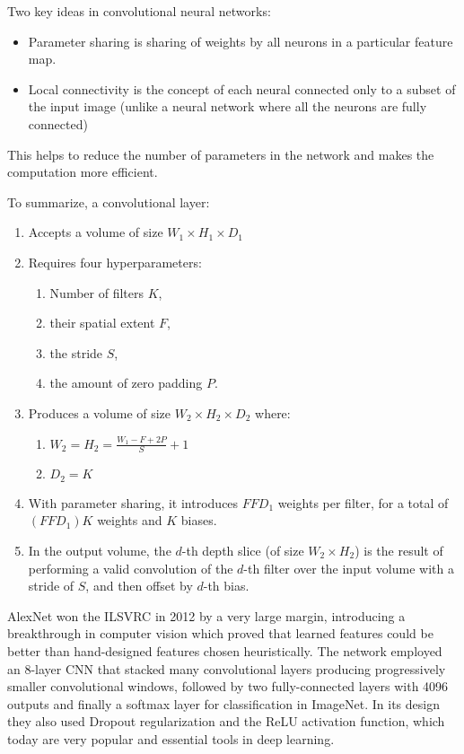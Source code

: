 Two key ideas in convolutional neural networks:

\begin{itemize}
    \item Parameter sharing is sharing of weights by all neurons in a particular feature map.
    \item Local connectivity is the concept of each neural connected only to a subset of the input image (unlike a neural network where all the neurons are fully connected)
\end{itemize}

This helps to reduce the number of parameters in the network and makes the computation more efficient.

To summarize, a convolutional layer:

\begin{enumerate}
    \item Accepts a volume of size $W_1 \times H_1 \times D_1$
    \item Requires four hyperparameters:
    \begin{enumerate}
        \item Number of filters $K$,
        \item their spatial extent $F$,
        \item the stride $S$,
        \item the amount of zero padding $P$.
    \end{enumerate}
    \item Produces a volume of size $W_2 \times H_2 \times D_2$ where:
    \begin{enumerate}
        \item $W_2 = H_2 = \frac{W_1 - F + 2P}{S} + 1$
        \item $D_2 = K$
    \end{enumerate}
    \item With parameter sharing, it introduces $F F D_1$ weights per filter, for a total of $(F F D_1) K$ weights and $K$ biases.
    \item In the output volume, the $d$-th depth slice (of size $W_2 \times H_2$) is the result of performing a valid convolution of the $d$-th filter over the input volume with a stride of $S$, and then offset by $d$-th bias.
\end{enumerate}

AlexNet \cite{alexnet} won the \ac{ILSVRC} \cite{imagenet} in 2012 by a very large margin, introducing a breakthrough in computer vision which proved that learned features could be better than hand-designed features chosen heuristically. The network employed an 8-layer \ac{CNN} that stacked many convolutional layers producing progressively smaller convolutional windows, followed by two fully-connected layers with 4096 outputs and finally a softmax layer for classification in ImageNet. In its design they also used Dropout regularization and the ReLU activation function, which today are very popular and essential tools in deep learning.

